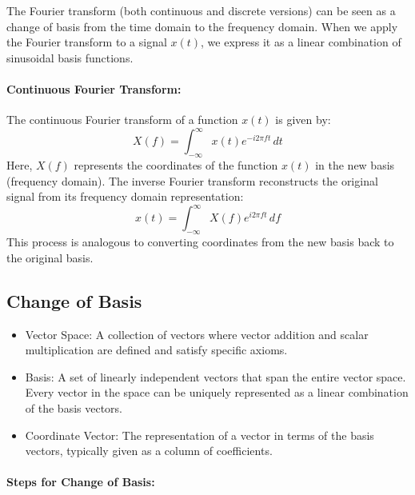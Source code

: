 The Fourier transform (both continuous and discrete versions) can be seen as a change of basis from the time domain to the frequency domain. When we apply the Fourier transform to a signal \( x(t) \), we express it as a linear combination of sinusoidal basis functions.

\paragraph{Continuous Fourier Transform:} The continuous Fourier transform of a function \( x(t) \) is given by:
  \[
  X(f) = \int_{-\infty}^{\infty} x(t) e^{-i 2 \pi f t} \, dt
  \]
  Here, \( X(f) \) represents the coordinates of the function \( x(t) \) in the new basis (frequency domain). The inverse Fourier transform reconstructs the original signal from its frequency domain representation:
  \[
  x(t) = \int_{-\infty}^{\infty} X(f) e^{i 2 \pi f t} \, df
  \]
  This process is analogous to converting coordinates from the new basis back to the original basis.

\subsection{Change of Basis}
\begin{itemize}
	\item Vector Space: A collection of vectors where vector addition and scalar multiplication are defined and satisfy specific axioms.
	\item Basis: A set of linearly independent vectors that span the entire vector space. Every vector in the space can be uniquely represented as a linear combination of the basis vectors.
	\item Coordinate Vector: The representation of a vector in terms of the basis vectors, typically given as a column of coefficients.
\end{itemize}

\paragraph{Steps for Change of Basis: }



